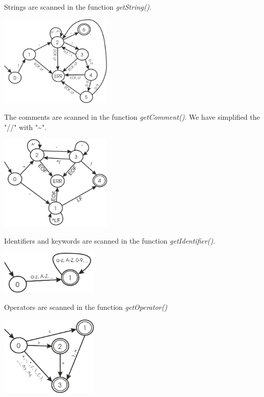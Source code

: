 \documentclass[10pt,a4paper,titlepage]{article}
\begin{document}
\begin{justify}
Strings are scanned in the function \textit{getString()}.
\end{justify}
\begin{center}
  \includegraphics[width=0.4\textwidth]{img/getString.png}
\end{center}

\begin{justify}
The comments are scanned in the function \textit{getComment()}. We have simplified the "//" with "\textasciitilde".
\end{justify}
\begin{center}
  \includegraphics[width=0.4\textwidth]{img/getComment.png}
\end{center}

\begin{justify}
Identifiers and keywords are scanned in the function \textit{getIdentifier()}.
\end{justify}
\begin{center}
  \includegraphics[width=0.35\textwidth]{img/getIdentifier.png}
\end{center}

\begin{justify}
Operators are scanned in the function \textit{getOperator()}
\end{justify}
\begin{center}
  \includegraphics[width=0.35\textwidth]{img/getOperator.png}
\end{center}
\end{document}
